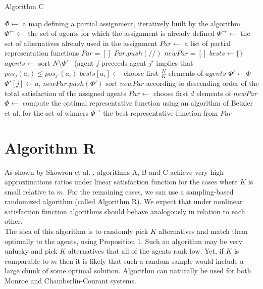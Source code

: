 \begin{algorithm}
\caption{Algorithm C}\label{euclid}
\begin{algorithmic}[1]
		\State $\Phi \gets$ a map defining a partial assignment, iteratively built by the algorithm
		\State $\Phi^{\leftarrow} \gets$ the set of agents for which the assignment is already defined
		\State $\Phi^{\rightarrow} \gets$ the set of alternatives already used in the assignment
		\State $Par \gets$ a list of partial representation functions
		\State $Par = []$
		\State $Par.push(/{/})$
			\State $newPar = []$
				\State $bests \gets \{\}$
					\State $agents \gets$ sort $N \setminus \Phi^{\leftarrow}$ (agent $j$ preceeds agent $j'$ implies that $pos_{j}(a_{i}) \leq pos_{j'}(a_{i})$
					\State $bests[a_{i}] \gets$ choose first $\frac{N}{K}$ elements of $agents$
					\State $\Phi' \gets \Phi$
						\State $\Phi'[j] \gets a_{i}$
					\EndFor
					\State $newPar.push(\Phi')$
				\EndFor
			\EndFor
			\State sort $newPar$ according to descending order of the total satisfaction of the assigned agents
			\State $Par \gets$ choose first $d$ elements of $newPar$
		\EndFor
			\State $\Phi \gets$ compute the optimal representative function using an algorithm of Betzler et al. \cite{3} for the set of winners $\Phi^{\rightarrow}$
		\EndFor
		\State \Return the best representative function from $Par$
	\EndProcedure
\end{algorithmic}
\end{algorithm}

\section{Algorithm R}

As shown by Skowron et al. \cite{1}, algorithms A, B and C achieve very high approximations ratios under linear satisfaction function for the cases where $K$ is small relative to $m$. For the remaining cases, we can use a sampling-based randomized algorithm (called Algorithm R). We expect that under nonlinear satisfaction function algorithms should behave analogously in relation to each other.
\\

The idea of this algorithm is to randomly pick $K$ alternatives and match them optimally to the agents, using Proposition 1. Such an algorithm may be very unlucky and pick $K$ alternatives that all of the agents rank low. Yet, if $K$ is comparable to $m$ then it is likely that such a random sample would include a large chunk of some optimal solution. Algorithm can naturally be used for both Monroe and Chamberlin-Courant systems.

